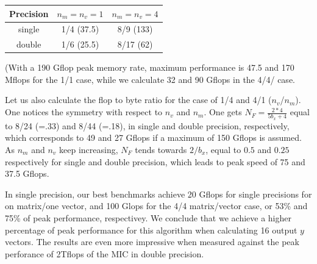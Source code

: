 \documentclass[10pt,conference,compsocconf]{IEEEtran}
\begin{document}
\begin{center}
\begin{tabular}{|c|c|c|}
\hline
Precision & $n_m=n_v=1$ & $n_m=n_v=4$     \\
\hline
single    &  1/4  (37.5)     &   8/9 (133) \\
double    &  1/6  (25.5)     &   8/17 (62) \\
\hline
\end{tabular}
\end{center}
(With a 190 Gflop peak memory rate, maximum performance is 47.5 and
170 Mflops for the 1/1 case, while we calculate 32 and 90 Gflops in
the 4/4/ case.

Let us also calculate the flop to byte ratio for the case of 1/4 and
4/1 ($n_v$/$n_m$). One notices the symmetry with respect to $n_v$ and
$n_m$.  One gets $N_F = \frac{2*4}{5 b_x + 4}$ equal to 8/24 (=.33)
and 8/44 (=.18), in single and double precision, respectively, which
corresponds to 49 and 27 Gflops if a maximum of 150 Gflops is assumed.
As $n_m$ and $n_v$ keep increasing, $N_F$ tends towards $2/b_x$, equal
to $0.5$ and $0.25$ respectively for single and double precision,
which leads to peak speed of 75 and 37.5 Gflops.

In single precision, our best benchmarks achieve 20 Gflops for single
precisions for on matrix/one vector, and 100 Glops for the 4/4
matrix/vector case, or 53\% and 75\% of peak performance,
respectivey. We conclude that we achieve a higher percentage of peak
performance for this algorithm when calculating 16 output $y$
vectors. The results are even more impressive when measured against
the peak perforance of 2Tflops of the MIC in double precision.
\end{document}
